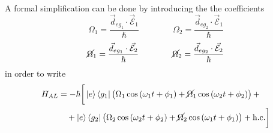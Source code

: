 A formal simplification can be done by introducing the the coefficients
\begin{equation*}
      \Omega_1 = \frac{\vec{d}_{eg_1} \cdot \vec{\mathcal{E}}_1}{\hbar}
      \qquad\qquad
      \Omega_2 = \frac{\vec{d}_{eg_2} \cdot \vec{\mathcal{E}}_1}{\hbar}
\end{equation*}
\begin{equation*}
    \cancel{\Omega}_1 = \frac{\vec{d}_{eg_1} \cdot \vec{\mathcal{E}}_2}{\hbar}
    \qquad\qquad
    \cancel{\Omega}_2 = \frac{\vec{d}_{eg_2} \cdot \vec{\mathcal{E}}_2}{\hbar}
\end{equation*}
in order to write
\begin{align*}
    H_{AL} &= -\hbar \bigg[ \ket{e}\bra{g_1} \left( \Omega_1 \cos{(\omega_1 t + \phi_1)} + \cancel{\Omega}_1 \cos{(\omega_2 t + \phi_2)}\right) + \\
    &~~~+ \ket{e}\bra{g_2} \left( \Omega_2 \cos{(\omega_2 t + \phi_2)} + \cancel{\Omega}_2 \cos{(\omega_1 t + \phi_1)}\right) + \text{h.c.} \bigg] 
\end{align*}

